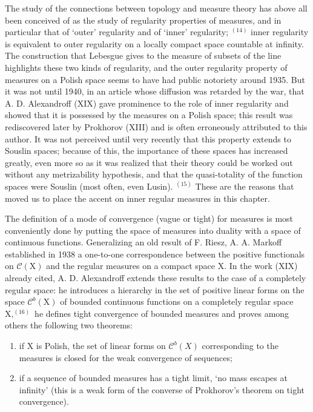 
The study of the connections between topology and measure theory has above all been conceived of as the study of regularity properties of measures, and in particular that of `outer' regularity and of `inner' regularity; \(^{(14)}\) inner regularity is equivalent to outer regularity on a locally compact space countable at infinity. The construction that Lebesgue gives to the measure of subsets of the line highlights these two kinds of regularity, and the outer regularity property of measures on a Polish space seems to have had public notoriety around 1935. But it was not until 1940, in an article whose diffusion was retarded by the war, that A. D. Alexandroff (XIX) gave prominence to the role of inner regularity and showed that it is possessed by the measures on a Polish space; this result was rediscovered later by Prokhorov (XIII) and is often erroneously attributed to this author. It was not perceived until very recently that this property extends to Souslin spaces; because of this, the importance of these spaces has increased greatly, even more so as it was realized that their theory could be worked out without any metrizability hypothesis, and that the quasi-totality of the function spaces were Souslin (most often, even Lusin). \(^{(15)}\) These are the reasons that moved us to place the accent on inner regular measures in this chapter.

The definition of a mode of convergence (vague or tight) for measures is most conveniently done by putting the space of measures into duality with a space of continuous functions. Generalizing an old result of F. Riesz, A. A. Markoff established in 1938 a one-to-one correspondence between the positive functionals on \(\mathcal{C}(\mathrm{X})\) and the regular measures on a compact space X. In the work (XIX) already cited, A. D. Alexandroff extends these results to the case of a completely regular space: he introduces a hierarchy in the set of positive linear forms on the space \(\mathcal{C}^b (\mathrm{X})\) of bounded continuous functions on a completely regular space \(\mathrm{X},^{(16)}\) he defines tight convergence of bounded measures and proves among others the following two theorems:

\begin{enumerate}
\def\labelenumi{\alph{enumi})}
\item
  if X is Polish, the set of linear forms on \(\mathcal{C}^{b}(X)\) corresponding to the measures is closed for the weak convergence of sequences;
\item
  if a sequence of bounded measures has a tight limit, `no mass escapes at infinity' (this is a weak form of the converse of Prokhorov's theorem on tight convergence).
\end{enumerate}


